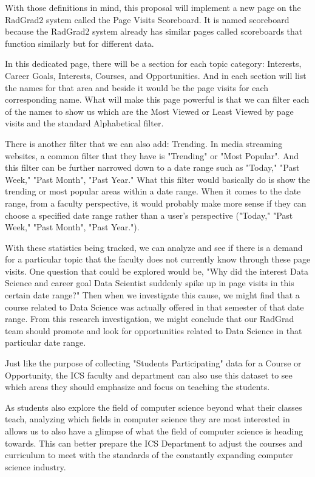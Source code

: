 \documentclass[english]{proposalnsf}
\begin{document}
  With those definitions in mind, this proposal will implement a new page on the RadGrad2 system called the Page Visits Scoreboard. It is named scoreboard because the RadGrad2 system already has similar pages called scoreboards that function similarly but for different data.

  In this dedicated page, there will be a section for each topic category: Interests, Career Goals, Interests, Courses, and Opportunities.
  And in each section will list the names for that area and beside it would be the page visits for each corresponding name.
  What will make this page powerful is that we can filter each of the names to show us which are the Most Viewed or Least Viewed by page visits and the standard Alphabetical filter.

  There is another filter that we can also add: Trending.
  In media streaming websites, a common filter that they have is "Trending" or "Most Popular".
  And this filter can be further narrowed down to a date range such as "Today," "Past Week," "Past Month", "Past Year." What this filter would basically do is show the trending or most popular areas within a date range.
  When it comes to the date range, from a faculty perspective, it would probably make more sense if they can choose a specified date range rather than a user's perspective ("Today," "Past Week," "Past Month", "Past Year.").

  With these statistics being tracked, we can analyze and see if there is a demand for a particular topic that the faculty does not currently know through these page visits.
  One question that could be explored would be, "Why did the interest Data Science and career goal Data Scientist suddenly spike up in page visits in this certain date range?" Then when we investigate this cause, we might find that a course related to Data Science was actually offered in that semester of that date range.
  From this research investigation, we might conclude that our RadGrad team should promote and look for opportunities related to Data Science in that particular date range.

  Just like the purpose of collecting "Students Participating" data for a Course or Opportunity, the ICS faculty and department can also use this dataset to see which areas they should emphasize and focus on teaching the students.

  As students also explore the field of computer science beyond what their classes teach, analyzing which fields in computer science they are most interested in allows us to also have a glimpse of what the field of computer science is heading towards. This can better prepare the ICS Department to adjust the courses and curriculum to meet with the standards of the constantly expanding computer science industry.
\end{document}
